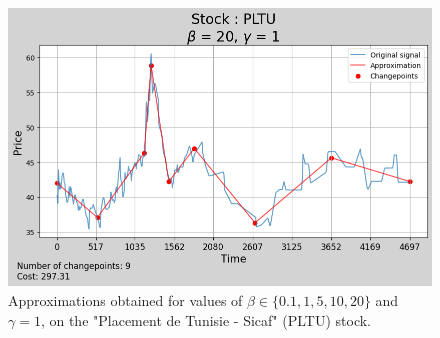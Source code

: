 \documentclass[11pt]{article}
\begin{document}
\begin{figure}
    \begin{minipage}[t]{0.42\textwidth}
        \includegraphics[width=\textwidth]{figures/results/beta_analysis_scale_1_stock_PLTU/beta_20.png}
    \end{minipage}
    \begin{minipage}[t]{0.42\textwidth}
        \hspace{0.42\textwidth}
    \end{minipage}
    \caption{Approximations obtained for values of $\beta \in \{0.1, 1, 5, 10, 20\}$ and $\gamma = 1$, on the "Placement de Tunisie - Sicaf" (PLTU) stock.}
    \label{fig:approximations_beta}
\end{figure}
\end{document}
